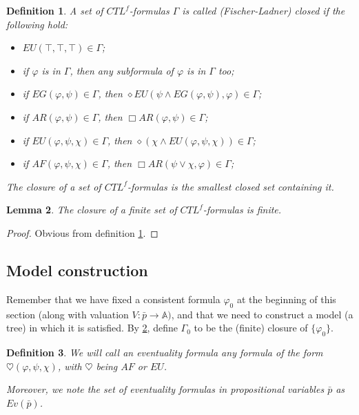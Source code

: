 \documentclass[11pt]{article}
\newcommand{\A}{{\mathbb A}}
\newcommand{\Evp}{{Ev(\bar{p})}}
\newtheorem{definition}{Definition}[section]
\newtheorem{lemma}[definition]{Lemma}
\begin{document}
\begin{definition}\label{F-L closure}
    A set of $CTL^f$-formulas $\Gamma$ is called \emph{(Fischer-Ladner) closed} if the following hold:
    \begin{itemize}
        \setlength\itemsep{0em}
        \item $EU(\top,\top,\top)\in\Gamma$;
        \item if $\varphi$ is in $\Gamma$, then any subformula of $\varphi$ is in $\Gamma$ too;
        \item if $EG(\varphi,\psi)\in\Gamma$, then $\diamond EU(\psi\wedge EG(\varphi,\psi),\varphi)\in\Gamma$;
        \item if $AR(\varphi,\psi)\in\Gamma$, then $\Box AR(\varphi,\psi)\in\Gamma$;
        \item if $EU(\varphi,\psi,\chi)\in\Gamma$, then $\diamond(\chi\wedge EU(\varphi,\psi,\chi))\in\Gamma$;
        \item if $AF(\varphi,\psi,\chi)\in\Gamma$, then $\Box AR(\psi\vee\chi,\varphi)\in\Gamma$;
    \end{itemize}
    The \emph{closure} of a set of $CTL^f$-formulas is the smallest closed set containing it. 
\end{definition}
\begin{lemma}\label{finite_closure}
    The closure of a finite set of $CTL^f$-formulas is finite.
\end{lemma}
\begin{proof}
    Obvious from definition \ref{F-L closure}.
\end{proof}

\subsection*{Model construction}
Remember that we have fixed a consistent formula $\varphi_0$ at the beginning of this section (along with valuation $V:\bar{p}\to\A)$, and that we need to construct a model (a tree) in which it is satisfied. By \ref{finite_closure}, define $\Gamma_0$ to be the (finite) closure of $\{\varphi_0\}$.

\begin{definition}\label{eventuality_fml}
    We will call an \emph{eventuality formula} any formula of the form $\heartsuit(\varphi,\psi,\chi)$, with $\heartsuit$ being $AF$ or $EU$.

    Moreover, we note the set of eventuality formulas in propositional variables $\bar{p}$ as $\Evp$.
\end{definition}
\end{document}
